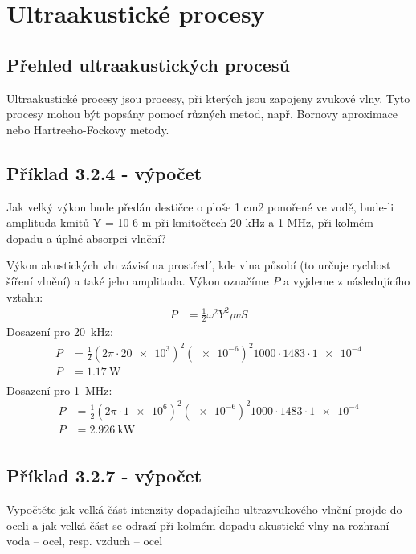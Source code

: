 \section{Ultraakustické procesy}

\subsection{Přehled ultraakustických procesů}

Ultraakustické procesy jsou procesy, při kterých jsou zapojeny zvukové vlny. Tyto procesy mohou být popsány pomocí různých metod, např. Bornovy aproximace nebo Hartreeho-Fockovy metody.

\subsection{Příklad 3.2.4 - výpočet}
\begin{zadani}
    Jak velký výkon bude předán destičce o ploše 1 cm2 ponořené ve 
    vodě, bude-li amplituda kmitů Y = 10-6 m  při kmitočtech 20 kHz a 
    1 MHz, při kolmém dopadu a úplné absorpci vlnění?
\end{zadani}


Výkon akustických vln závisí na prostředí, kde vlna působí (to určuje rychlost šíření vlnění) a také jeho amplituda. Výkon označíme \(P\) a vyjdeme z následujícího vztahu:
\begin{align*}
    P &= \frac{1}{2}\omega^2 Y^2 \rho vS
\end{align*}
Dosazení pro \qty{20}{kHz}:
\begin{align*}
    P &= \frac{1}{2}(2\pi\cdot \num{20e3})^2 (\num{e-6})^2 \num{1000}\cdot \num{1483}\cdot \num{1e-4} \\
    P &= \qty{1,17}{\watt} \\
\end{align*}
Dosazení pro \qty{1}{MHz}:
\begin{align*}
    P &= \frac{1}{2}(2\pi\cdot \num{1e6})^2 (\num{e-6})^2 \num{1000}\cdot \num{1483}\cdot \num{1e-4} \\
    P &= \qty{2,926}{\kilo\watt} \\
\end{align*}

\subsection{Příklad 3.2.7 - výpočet}
\begin{zadani}
    Vypočtěte jak velká část intenzity dopadajícího ultrazvukového vlnění 
    projde do oceli a jak velká část se odrazí při kolmém dopadu 
    akustické vlny na rozhraní  voda – ocel,  resp.  vzduch – ocel
\end{zadani}



